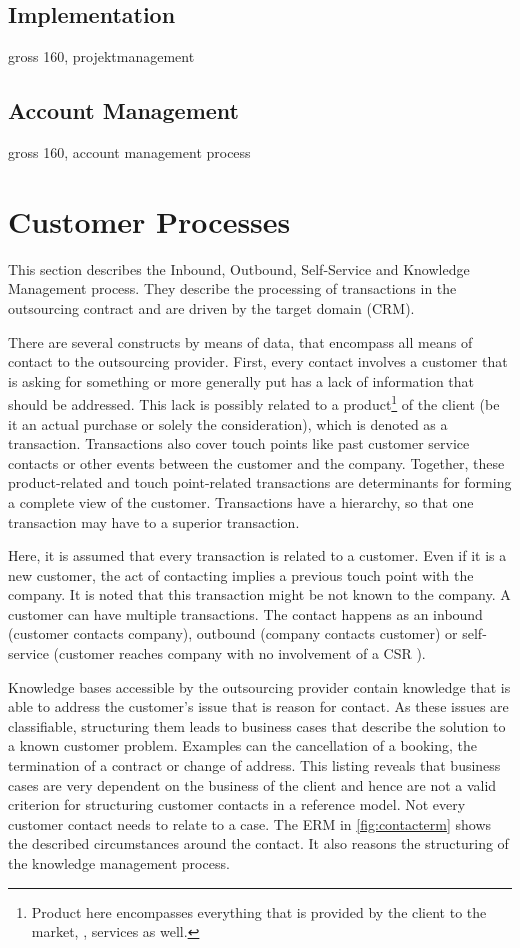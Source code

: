 	\subsection{Implementation}
	gross 160, projektmanagement
	
	\subsection{Account Management}
	gross 160, account management process
	\section{Customer Processes}
	
	This section describes the Inbound, Outbound, Self-Service and Knowledge Management process. They describe the processing of transactions in the outsourcing contract and are driven by the target domain (\acrshort{CRM}). 
	
	There are several constructs by means of data, that encompass all means of contact to the outsourcing provider. First, every contact involves a customer that is asking for something or more generally put has a lack of information that should be addressed. This lack is possibly related to a product\footnote{Product here encompasses everything that is provided by the client to the market, \ie, services as well.} of the client (be it an actual purchase or solely the consideration), which is denoted as a transaction. Transactions also cover touch points like past customer service contacts or other events between the customer and the company. Together, these product-related and touch point-related transactions are determinants for forming a complete view of the customer. Transactions have a hierarchy, so that one transaction may have to a superior transaction. 
	
	Here, it is assumed that every transaction is related to a customer. Even if it is a new customer, the act of contacting implies a previous touch point with the company. It is noted that this transaction might be not known to the company. A customer can have multiple transactions. The contact happens as an inbound (customer contacts company), outbound (company contacts customer) or self-service (customer reaches company with no involvement of a \acrshort{CSR} ). 
	
	Knowledge bases accessible by the outsourcing provider contain knowledge that is able to address the customer's issue that is reason for contact. As these issues are classifiable, structuring them leads to business cases that describe the solution to a known customer problem. Examples can the cancellation of a booking, the termination of a contract or change of address. This listing reveals that business cases are very dependent on the business of the client and hence are not a valid criterion for structuring customer contacts in a reference model. Not every customer contact needs to relate to a case. The \acrshort{ERM} in \Fig \ref{fig:contacterm} shows the described circumstances around the contact. It also reasons the structuring of the knowledge management process. 
	
